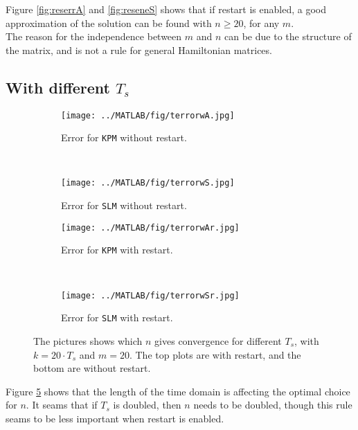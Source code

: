 Figure \ref{fig:reserrA} and \ref{fig:reseneS} shows that if restart is enabled, a good approximation of the solution can be found with $n \geq 20$, for any $m$.\\

The reason for the independence between $m$ and $n$ can be due to the structure of the matrix, and is not a rule for general Hamiltonian matrices.

\subsection{With different $T_s$} %

\begin{figure}[H]
        \centering
        \begin{subfigure}[b]{0.3\textwidth}
                \texttt{[image: ../MATLAB/fig/terrorwA.jpg]}
                \caption{ Error for \texttt{KPM} without restart. }
                \label{fig:terrorwA}
        \end{subfigure}
		~
		\begin{subfigure}[b]{0.3\textwidth}
                \texttt{[image: ../MATLAB/fig/terrorwS.jpg]}
                \caption{ Error for \texttt{SLM} without restart. }
                \label{fig:terrorwS}
        \end{subfigure}
        
        \begin{subfigure}[b]{0.3\textwidth}
                \texttt{[image: ../MATLAB/fig/terrorwAr.jpg]}
                \caption{ Error for \texttt{KPM} with restart. }
                \label{fig:terrorwAr}
        \end{subfigure}
		~
		\begin{subfigure}[b]{0.3\textwidth}
                \texttt{[image: ../MATLAB/fig/terrorwSr.jpg]}
                \caption{ Error for \texttt{SLM} with restart. }
                \label{fig:terrorwSr}
        \end{subfigure}        
        
        \caption{ The pictures shows which $n$ gives convergence for different $T_s$, with $k = 20 \cdot T_s$ and $m = 20$. The top plots are with restart, and the bottom are without restart.}
        \label{fig:rest}
\end{figure}
Figure \ref{fig:rest} shows that the length of the time domain is affecting the optimal choice for $n$. It seams that if $T_s$ is doubled, then $n$ needs to be doubled, though this rule seams to be less important when restart is enabled. \\

